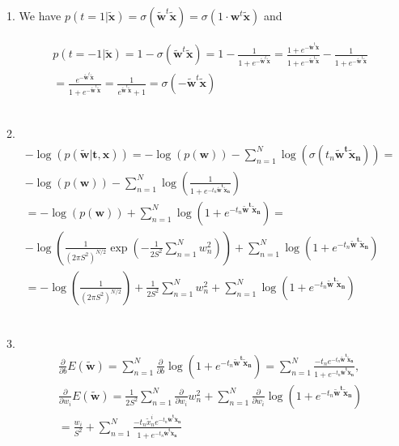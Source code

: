\documentclass[english]{exercisesheet}
\begin{document}
\begin{solution}
 1. We have $p(t=1|\bm{\tilde{x}})=\sigma(\bm{\tilde{w}}^t\bm{\tilde{x}})=\sigma(1\cdot\bm{w}^t\bm{\tilde{x}})$ and

 \begin{align*}
 p(t=-1|\bm{\tilde{x}})=1-\sigma(\bm{\tilde{w}}^t\bm{\tilde{x}})=1-\frac{1}{1+e^{-\bm{\tilde{w}}^t\bm{\tilde{x}}}}=\frac{1+e^{-\bm{\tilde{w}}^t\bm{\tilde{x}}}}{1+e^{-\bm{\tilde{w}}^t\bm{\tilde{x}}}}-\frac{1}{1+e^{-\bm{\tilde{w}}^t\bm{\tilde{x}}}}\\=\frac{e^{-\bm{\tilde{w}}^t\bm{\tilde{x}}}}{1+e^{-\bm{\tilde{w}}^t\bm{\tilde{x}}}}=\frac{1}{e^{\bm{\tilde{w}}^t\bm{\tilde{x}}}+1}=\sigma(-\bm{\tilde{w}}^t\bm{\tilde{x}})
\end{align*}\\
\par 2.
\begin{align*}
 -\log (p(\bm{\tilde{w}}|\bm{t},\bm{x}))=-\log(p(\bm{w}))-\sum_{n=1}^N \log(\sigma(t_n\bm{\tilde{w}^t\tilde{x}_n}))=\\-\log(p(\bm{w}))-\sum_{n=1}^N \log(\frac{1}{1+e^{-t_n\bm{\tilde{w}^t\tilde{x}_n}}})\\
 =-\log(p(\bm{w}))+\sum_{n=1}^N \log(1+e^{-t_n\bm{\tilde{w}^t\tilde{x}_n}})=\\-\log\left(\frac{1}{(2\pi S^{2})^{N/2}}\exp\left(-\frac{1}{2S^{2}}\sum_{n=1}^N w_n^2\right)\right)+\sum_{n=1}^N \log(1+e^{-t_n\bm{\tilde{w}^t\tilde{x}_n}})\\
 =-\log\left(\frac{1}{(2\pi S^{2})^{N/2}}\right)+\frac{1}{2S^{2}}\sum_{n=1}^N w_n^2+\sum_{n=1}^N \log(1+e^{-t_n\bm{\tilde{w}^t\tilde{x}_n}})
\end{align*}\\
\par 3.
\begin{align*}
 \frac{\partial}{\partial b}E(\bm{\tilde{w}})=\sum_{n=1}^N\frac{\partial}{\partial b} \log(1+e^{-t_n\bm{\tilde{w}^t\tilde{x}_n}})=\sum_{n=1}^N\frac{-t_ne^{-t_n\bm{\tilde{w}^t\tilde{x}_n}}}{1+e^{-t_n\bm{\tilde{w}^t\tilde{x}_n}}},\\
 \frac{\partial}{\partial w_i}E(\bm{\tilde{w}})=\frac{1}{2S^{2}}\sum_{n=1}^N  \frac{\partial}{\partial w_i} w_n^2+\sum_{n=1}^N\frac{\partial}{\partial w_i} \log(1+e^{-t_n\bm{\tilde{w}^t\tilde{x}_n}})\\
 =\frac{w_i}{S^{2}}+\sum_{n=1}^N\frac{-t_n\tilde{x}_n^ie^{-t_n\bm{\tilde{w}^t\tilde{x}_n}}}{1+e^{-t_n\bm{\tilde{w}^t\tilde{x}_n}}}
\end{align*}
\\

\end{solution}
\end{document}

